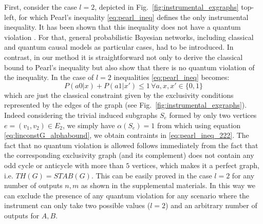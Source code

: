 \documentclass[letterpaper]{article}
\begin{document}
First, consider the case $l=2$, depicted in
Fig.~\ref{fig:instrumental_exgraphs} top-left, for which Pearl's
inequality \eqref{eq:pearl_ineq} defines the only instrumental inequality.
It has been shown that this inequality does not have a quantum violation
\cite{henson2014}.  For that, general probabilistic Bayesian networks,
including classical and quantum causal models as particular cases, had
to be introduced.  In contrast, in our method it is straightforward not
only to derive the classical bound to Pearl's inequality but also show
that there is no quantum violation of the inequality.  In the case of
$l=2$ inequalities \eqref{eq:pearl_ineq} becomes:
\begin{equation}
    P(a0|x) + P(a1|x') \le 1 \, \forall a,x,x' \in \{0,1\} 
    \label{eq:pearl_ineq_222}
\end{equation}
which are just the classical constraint given by the exclusivity
conditions represented by the edges of the graph (see
Fig.~\ref{fig:instrumental_exgraphs}).  Indeed considering the
trivial induced subgraphs $S_e$ formed by only two vertices $e =
(v_1, v_2) \in E_2$, we simply have $\alpha(S_e) = 1$ from which
using equation \eqref{eq:linconstG_alphabound}, we obtain contraints in
\eqref{eq:pearl_ineq_222}.  The fact that no quantum violation is allowed
follows immediately from the fact that the corresponding  exclusivity
graph (and its complement) does not contain any odd cycle or anticycle
with more than $5$ vertices, which makes it a perfect graph, i.e. $TH(G)
= STAB(G)$. This can be easily proved in the case $l=2$ for any number
of outputs $n,m$ as shown in the supplemental materials. In this way
we can exclude the presence of any quantum violation for any scenario
where the instrument can only take two possible values ($l=2$) and an
arbitrary number of outputs for $A, B$.
\end{document}
